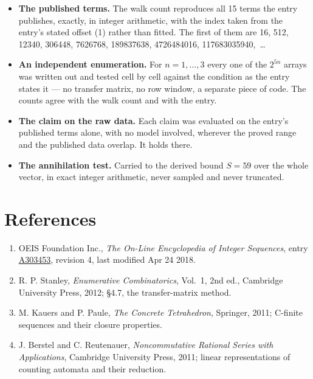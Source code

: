\documentclass[11pt]{article}
\theoremstyle{definition}
\begin{document}
\begin{itemize}

\item {\bfseries The published terms.} The walk count reproduces all 15 terms the entry publishes, exactly, in integer arithmetic, with the index taken from the entry's stated offset (1) rather than fitted. The first of them are 16, 512, 12340, 306448, 7626768, 189837638, 4726484016, 117683035940,~\dots

\item {\bfseries An independent enumeration.} For $n = 1,\dots,3$ every one of the $2^{5n}$ arrays was written out and tested cell by cell against the condition as the entry states it --- no transfer matrix, no row window, a separate piece of code. The counts agree with the walk count and with the entry.

\item {\bfseries The claim on the raw data.} Each claim was evaluated on the entry's published terms alone, with no model involved, wherever the proved range and the published data overlap. It holds there.

\item {\bfseries The annihilation test.} Carried to the derived bound $S = 59$ over the whole vector, in exact integer arithmetic, never sampled and never truncated.

\end{itemize}

\section{References}

\begin{enumerate}

\item OEIS Foundation Inc., \emph{The On-Line Encyclopedia of Integer Sequences}, entry \href{https://oeis.org/A303453}{A303453}, revision 4, last modified Apr 24 2018.

\item R. P. Stanley, \emph{Enumerative Combinatorics}, Vol.~1, 2nd ed., Cambridge University Press, 2012; \S4.7, the transfer-matrix method.

\item M. Kauers and P. Paule, \emph{The Concrete Tetrahedron}, Springer, 2011; C-finite sequences and their closure properties.

\item J. Berstel and C. Reutenauer, \emph{Noncommutative Rational Series with Applications}, Cambridge University Press, 2011; linear representations of counting automata and their reduction.

\end{enumerate}
\end{document}
